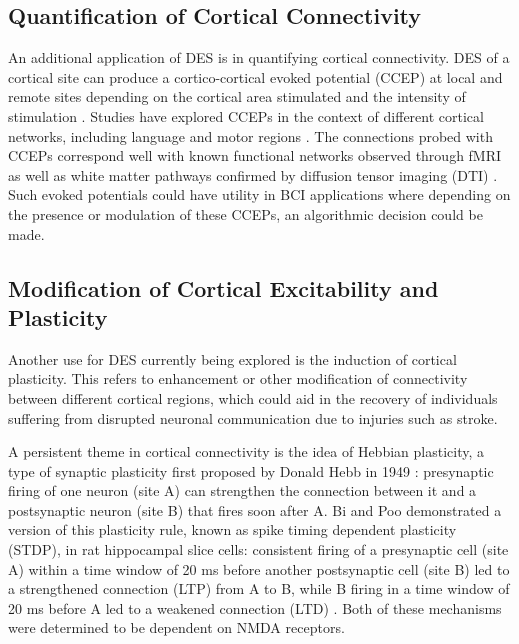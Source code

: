 \subsection{Quantification of Cortical Connectivity}

An additional application of DES is in quantifying cortical connectivity. DES of a cortical site can produce a cortico-cortical evoked potential (CCEP) at local and remote sites depending on the cortical area stimulated and the intensity of stimulation \cite{Keller2014e}. Studies have explored CCEPs in the context of different cortical networks, including language \cite{Matsumoto2004b} and motor regions \cite{Matsumoto2006a}. The connections probed with CCEPs correspond well with known functional networks observed through fMRI as well as white matter pathways confirmed by diffusion tensor imaging (DTI) \cite{Keller2014d}. Such evoked potentials could have utility in BCI applications where depending on the presence or modulation of these CCEPs, an algorithmic decision could be made. 

\subsection{Modification of Cortical Excitability and Plasticity}

Another use for DES currently being explored is the induction of cortical plasticity. This refers to enhancement or other modification of connectivity between different cortical regions, which could aid in the recovery of individuals suffering from disrupted neuronal communication due to injuries such as stroke. 

A persistent theme in cortical connectivity is the idea of Hebbian plasticity, a type of synaptic plasticity first proposed by Donald Hebb in 1949 \cite{Hebb1949}: presynaptic firing of one neuron (site A) can strengthen the connection between it and a postsynaptic neuron (site B) that fires soon after A. Bi and Poo demonstrated a version of this plasticity rule, known as spike timing dependent plasticity (STDP), in rat hippocampal slice cells: consistent firing of a presynaptic cell (site A) within a time window of 20 ms before another postsynaptic cell (site B) led to a strengthened connection (LTP) from A to B, while B firing in a time window of 20 ms before A led to a weakened connection (LTD) \cite{Bi1998}. Both of these mechanisms were determined to be dependent on NMDA receptors. 

